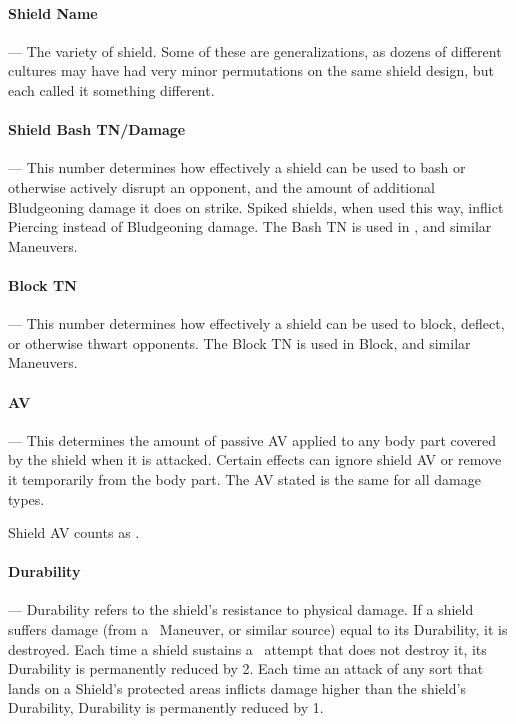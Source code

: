 \documentclass[oneside,11pt,english]{book}
\begin{document}
\paragraph{Shield Name}---\quad
The variety of shield. Some of these are generalizations, as dozens of different cultures may have had 
very minor permutations on the same shield design, but each called it something different. 


\vspace{-10pt}\paragraph{Shield Bash TN/Damage}---\quad
This number determines how effectively a shield can be used to bash or otherwise actively disrupt an opponent, and the amount of additional Bludgeoning damage it does on strike. Spiked shields, when used this way, inflict Piercing instead of Bludgeoning damage. The Bash TN is used in , and similar Maneuvers.

\vspace{-10pt}\paragraph{Block TN}---\quad
This number determines how effectively a shield can be used to block, deflect, or otherwise thwart 
opponents. The Block TN is used in Block, and similar Maneuvers. 

\vspace{-10pt}\paragraph{AV}---\quad
This determines the amount of passive AV applied to any body part covered by the shield when it is attacked. Certain effects can ignore shield AV or remove it temporarily from the body part. The AV 
stated is the same for all damage types.

Shield AV counts as .

\vspace{-10pt}\paragraph{Durability}---\quad
Durability refers to the shield’s resistance to physical damage. If a shield suffers damage (from a ~Maneuver, or similar source) equal to its Durability, it is destroyed. Each time a shield sustains a ~attempt that does not destroy it, its Durability is permanently reduced by 2. Each time an attack of any 
sort that lands on a Shield’s protected areas inflicts damage higher than the shield's Durability, Durability 
is permanently reduced by 1.
\end{document}
